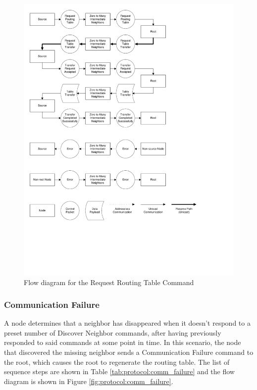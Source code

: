 \begin{figure}[ptb]
	\begin{centering}
		\includegraphics[scale=0.75]{Protocol/Figures/protocol-request_routing_table.pdf}
		\caption{Flow diagram for the Request Routing Table Command}
		\label{fig:protocol:request_routing_table}
	\end{centering}
\end{figure}
 
\subsubsection{Communication Failure}\label{ref:protocol:methodology:commands:comm_failure}

A node determines that a neighbor has disappeared when it doesn't respond to a preset number of Discover Neighbor commands, after having previously responded to said commands at some point in time. In this scenario, the node that discovered the missing neighbor sends a Communication Failure command to the root, which causes the root to regenerate the routing table. The list of sequence steps are shown in Table \ref{tab:protocol:comm_failure} and the flow diagram is shown in Figure \ref{fig:protocol:comm_failure}.

